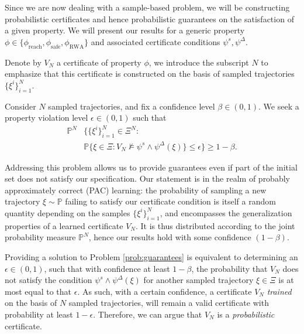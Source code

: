 Since we are now dealing with a sample-based problem, we will be constructing probabilistic certificates and hence probabilistic guarantees on the satisfaction of a given property. We will present our results for a generic property $\phi \in \{\phi_{\mathrm{reach}}, \phi_{\mathrm{safe}}, \phi_{\mathrm{RWA}}\}$ and associated certificate conditions $\psi^s, \psi^{\Delta}$. 

Denote by $V_N$ a certificate of property $\phi$, we introduce the subscript $N$ to emphasize that this certificate is constructed on the basis of sampled trajectories $\{\xi^i\}_{i=1}^N$.

\begin{prob}\label{prob:guarantees}
   Consider $N$ sampled trajectories, and fix a confidence level $\beta \in (0,1)$. We seek a property violation level $\epsilon \in (0,1)$ such that 
    \begin{align}
       \mathbb{P}^N &\big\{ \{\xi^i\}_{i=1}^N \in \Xi^N:~ \nonumber \\
       &\mathbb{P}\{\xi \in \Xi \colon V_N \not\models \psi^s \wedge \psi^\Delta(\xi)\} \leq \epsilon \big \} \geq 1-\beta. \label{eq:prop_prob}
    \end{align}
\end{prob}

Addressing this problem allows us to provide guarantees even if part of the initial set does not satisfy our specification.
Our statement is in the realm of probably approximately correct (PAC) learning: the probability of sampling a new trajectory $\xi \sim \mathbb{P}$ failing to satisfy our certificate condition is itself a random quantity depending on the samples $\{\xi^i\}_{i=1}^N$, and encompasses the generalization properties of a learned certificate $V_N$. It is thus distributed according to the joint probability measure $\mathbb{P}^N$, hence our results hold with some confidence $(1-\beta)$.

Providing a solution to Problem \ref{prob:guarantees} is equivalent to determining an $\epsilon \in (0,1)$, such that with confidence at least $1-\beta$, the probability that $V_N$ does not satisfy the condition $\psi^s \wedge \psi^\Delta(\xi)$ for another sampled trajectory $\xi \in \Xi$ is at most equal to that $\epsilon$. As such, with a certain confidence, a certificate $V_N$ \emph{trained} on the basis of $N$ sampled trajectories, will remain a valid certificate with probability at least $1-\epsilon$. Therefore, we can argue that  $V_N$ is a \emph{probabilistic} certificate.

